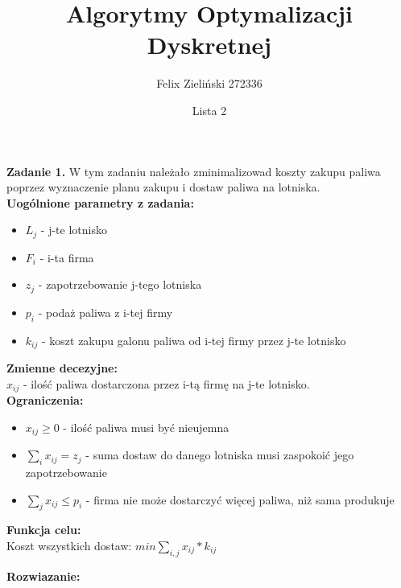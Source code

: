 \documentclass[15pt, a4paper]{article}
\title{Algorytmy Optymalizacji Dyskretnej}
\author{Felix Zieliński 272336}
\date{Lista 2}
\begin{document}
\maketitle

\noindent\hrulefill

\vspace{0.5cm}


\noindent\textbf{Zadanie 1.} W tym zadaniu należało zminimalizowad koszty zakupu paliwa poprzez wyznaczenie planu zakupu i dostaw paliwa na lotniska.\\

\noindent\textbf{Uogólnione parametry z zadania:}

\begin{itemize}
    \item \( L_j \) - j-te lotnisko
    \item \( F_i \) - i-ta firma
    \item \( z_j \) - zapotrzebowanie j-tego lotniska
    \item \( p_i \) - podaż paliwa z i-tej firmy
    \item \( k_{ij} \) - koszt zakupu galonu paliwa od i-tej firmy przez j-te lotnisko
\end{itemize}

\noindent\textbf{Zmienne decezyjne:}\\

\(x_{ij}\) - ilość paliwa dostarczona przez i-tą firmę na j-te lotnisko.\\

\noindent\textbf{Ograniczenia:}

\begin{itemize}
    \item \(x_{ij} \geq 0 \) - ilość paliwa musi być nieujemna
    \item \(\sum_{i}x_{ij} = z_j\)  - suma dostaw do danego lotniska musi zaspokoić jego zapotrzebowanie 
    \item \(\sum_{j}x_{ij} \leq p_i \) - firma nie może dostarczyć więcej paliwa, niż sama produkuje
\end{itemize}

\noindent\textbf{Funkcja celu:}\\

Koszt wszystkich dostaw: \(min \sum_{i, j}x_{ij} * k_{ij} \)\\

\pagebreak

\noindent\textbf{Rozwiazanie:}\\ 
\end{document}
